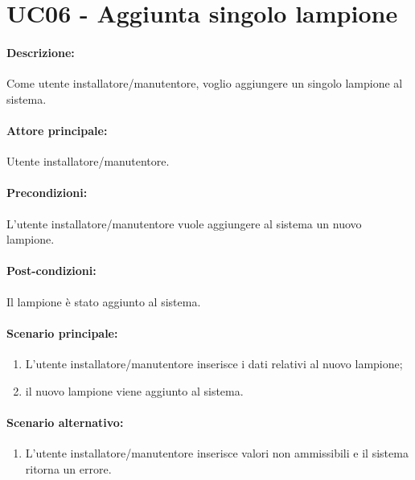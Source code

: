 \section{UC06 - Aggiunta singolo lampione}

\paragraph{Descrizione:}
Come utente installatore/manutentore, voglio aggiungere un singolo lampione al sistema.

\paragraph{Attore principale:}
Utente installatore/manutentore.

\paragraph{Precondizioni:}
L'utente installatore/manutentore vuole aggiungere al sistema un nuovo lampione.

\paragraph{Post-condizioni:}
Il lampione è stato aggiunto al sistema.

\paragraph{Scenario principale:}
\begin{enumerate}
    \item L'utente installatore/manutentore inserisce i dati relativi al nuovo lampione;
    \item il nuovo lampione viene aggiunto al sistema.
\end{enumerate}

\paragraph{Scenario alternativo:}
\begin{enumerate}
    \item L'utente installatore/manutentore inserisce valori non ammissibili e il sistema ritorna un errore.
\end{enumerate}